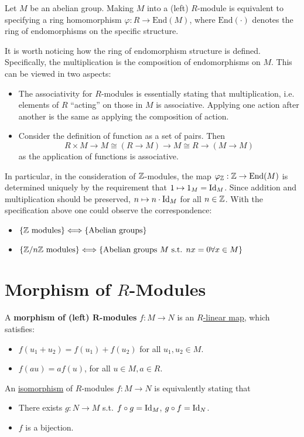 \documentclass{article}
\begin{document}
\begin{remark}
    Let $M$ be an abelian group. Making $M$ into a (left) $R$-module is equivalent to specifying a ring homomorphism $\varphi: R\to \mathrm{End}(M)$, where $\mathrm{End}(\cdot)$ denotes the ring of endomorphisms on the specific structure. 
    
    It is worth noticing how the ring of endomorphism structure is defined. Specifically, the multiplication is the composition of endomorphisms on $M$. This can be viewed in two aspects:
    \begin{itemize}
        \item The associativity for $R$-modules is essentially stating that multiplication, i.e. elements of $R$ ``acting'' on those in $M$ is associative. Applying one action after another is the same as applying the composition of action.  
        \item Consider the definition of function as a set of pairs. Then
        \[
            R\times M \to M \cong (R\to M) \to M \cong R\to(M\to M)
        \]
        as the application of functions is associative. 
    \end{itemize}

    In particular, in the consideration of $\mathbb{Z}$-modules, the map $\varphi_{\mathbb{Z}}: \mathbb{Z} \to \mathrm{End}(M)$ is determined uniquely by the requirement that $1\mapsto 1_M = \mathrm{Id}_M$. Since addition and multiplication should be preserved, $n\mapsto n\cdot \mathrm{Id}_{M}$ for all $n\in \mathbb{Z}$. With the specification above one could observe the correspondence:
    \begin{itemize}
        \item $\{\mathbb{Z} \text{ modules}\} \Longleftrightarrow \{ \text{Abelian groups} \}$
        \item  $\{\mathbb{Z}/n\mathbb{Z} \text{ modules}\} \Longleftrightarrow \{ \text{Abelian groups } M \text{ s.t. } nx = 0\forall x\in M \}$
    \end{itemize}
\end{remark}

\section{Morphism of $R$-Modules}

\begin{definition}
    A \textbf{morphism of (left) $\bm{R}$-modules} $f: M\to N$ is an \underline{$R$-linear map}, which satisfies:
    \begin{itemize}
        \item $f(u_1 + u_2) = f(u_1) + f(u_2)$ for all $u_1, u_2\in M$.
        \item $f(au) = af(u)$, for all $u \in M, a\in R$.
    \end{itemize} 

    An \underline{isomorphism} of $R$-modules $f: M\to N$ is equivalently stating that
    \begin{itemize}
        \item There exists $g: N\to M$ s.t. $f\circ g = \mathrm{Id}_{M}$, $g\circ f = \mathrm{Id}_{N}$.
        \item $f$ is a bijection.
    \end{itemize}
\end{definition}
\end{document}
